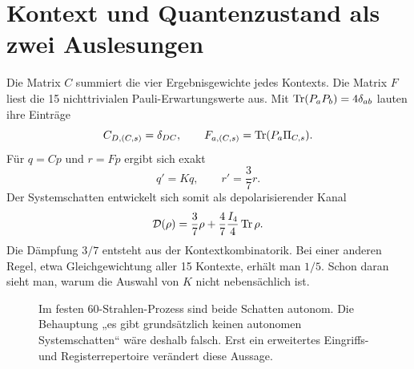 \section{Kontext und Quantenzustand als zwei Auslesungen}
Die Matrix $C$ summiert die vier Ergebnisgewichte jedes Kontexts. Die Matrix $F$ liest die 15 nichttrivialen Pauli-Erwartungswerte aus. Mit $\operatorname{Tr}(P_aP_b)=4\delta_{ab}$ lauten ihre Einträge
\begin{equation}
C_{D,(C,s)}=\delta_{DC},\qquad
F_{a,(C,s)}=\operatorname{Tr}(P_a\Pi_{C,s}).
\end{equation}
Für $q=Cp$ und $r=Fp$ ergibt sich exakt
\begin{equation}
q'=Kq,\qquad r'=\frac37r.
\label{eq:shadows}
\end{equation}
Der Systemschatten entwickelt sich somit als depolarisierender Kanal
\begin{equation}
\mathcal D(\rho)=\frac37\rho+\frac47\frac{I_4}{4}\operatorname{Tr}\rho.
\label{eq:D}
\end{equation}
Die Dämpfung $3/7$ entsteht aus der Kontextkombinatorik. Bei einer anderen Regel, etwa Gleichgewichtung aller 15 Kontexte, erhält man $1/5$. Schon daran sieht man, warum die Auswahl von $K$ nicht nebensächlich ist.

\begin{figure}[H]\centering
{}
\caption{Im festen 60-Strahlen-Prozess sind beide Schatten autonom. Die Behauptung „es gibt grundsätzlich keinen autonomen Systemschatten“ wäre deshalb falsch. Erst ein erweitertes Eingriffs- und Registerrepertoire verändert diese Aussage.}
\end{figure}

